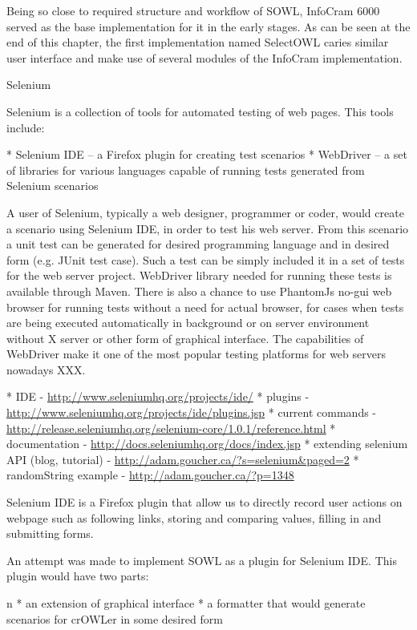 Being so close to required structure and workflow of SOWL, InfoCram 6000 served
as the base implementation for it in the early stages. As can be seen at the end 
of this chapter, the first implementation named SelectOWL caries similar user
interface and make use of several modules of the InfoCram implementation. 


\secc Selenium

Selenium is a collection of tools for automated testing of web pages. This tools include: 

\begitems
  * Selenium IDE -- a Firefox plugin for creating test scenarios
  * WebDriver -- a set of libraries for various languages capable of running
    tests generated from Selenium scenarios
\enditems

A user of Selenium, typically a web designer, programmer or coder, would create
a scenario using Selenium IDE, in order to test his web server. From this
scenario a unit test can be generated for desired programming language and in
desired form (e.g. JUnit test case). Such a test can be simply included it in a
set of tests for the web server project. WebDriver library needed for running
these tests is available through Maven. There is also a chance to use PhantomJs
no-gui web browser for running tests without a need for actual browser, for
cases when tests are being executed automatically in background or on server
environment without X server or other form of graphical interface. The
capabilities of WebDriver make it one of the most popular testing platforms for
web servers nowadays XXX. 

\begitems
  * IDE - \url{http://www.seleniumhq.org/projects/ide/}
  * plugins - \url{http://www.seleniumhq.org/projects/ide/plugins.jsp}
  * current commands - \url{http://release.seleniumhq.org/selenium-core/1.0.1/reference.html}
  * documentation - \url{http://docs.seleniumhq.org/docs/index.jsp}
  * extending selenium API (blog, tutorial) - \url{http://adam.goucher.ca/?s=selenium&paged=2}
  \begitems
    * randomString example - \url{http://adam.goucher.ca/?p=1348}
  \enditems
\enditems

Selenium IDE is a Firefox plugin that allow us to directly record user actions
on webpage such as following links, storing and comparing values, filling in
and submitting forms. 

An attempt was made to implement SOWL as a plugin for Selenium IDE. This plugin
would have two parts: 

\begitems \style n
  * an extension of graphical interface
  * a formatter that would generate scenarios for crOWLer in some desired form
\enditems

